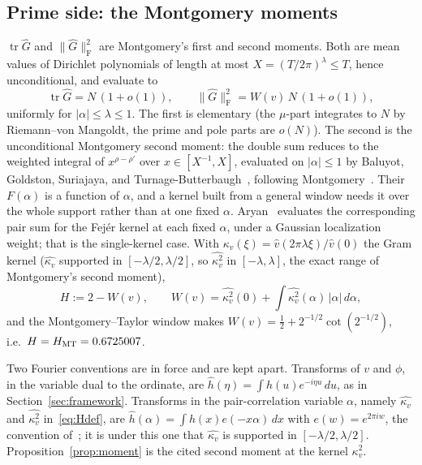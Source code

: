 \documentclass[11pt]{article}
\theoremstyle{definition}
\DeclareMathOperator{\tr}{tr}
\newcommand{\F}{\mathrm{F}}
\begin{document}
\subsection{Prime side: the Montgomery moments}
$\tr\widehat G$ and $\|\widehat G\|_{\F}^2$ are Montgomery's first and second
moments. Both are mean values of Dirichlet polynomials of length at most
$X=(T/2\pi)^\lambda\le T$, hence unconditional, and evaluate to
\begin{equation}\label{eq:moments}
  \tr\widehat G=N\,(1+o(1)),\qquad \|\widehat G\|_{\F}^2=W(v)\,N\,(1+o(1)),
\end{equation}
uniformly for $|\alpha|\le\lambda\le1$. The first is elementary (the $\mu$-part
integrates to $N$ by Riemann--von Mangoldt, the prime and pole parts are $o(N)$).
The second is the unconditional Montgomery second moment: the double sum reduces to
the weighted integral of $x^{\rho-\rho'}$ over $x\in[X^{-1},X]$, evaluated on
$|\alpha|\le1$ by Baluyot, Goldston, Suriajaya, and
Turnage-Butterbaugh~\cite{BGSTB24}, following Montgomery~\cite{Mon73,Mon75}. Their
$F(\alpha)$ is a function of $\alpha$, and a kernel built from a general window
needs it over the whole support rather than at one fixed $\alpha$. Aryan~\cite{Aryan22} evaluates the corresponding pair sum for the
Fej\'er kernel at each fixed $\alpha$, under a Gaussian localization weight; that
is the single-kernel case. With
$\kappa_v(\xi)=\widehat v(2\pi\lambda\xi)/\widehat v(0)$ the Gram kernel
($\widehat{\kappa_v}$ supported in $[-\lambda/2,\lambda/2]$, so
$\widehat{\kappa_v^2}$ in $[-\lambda,\lambda]$, the exact range of Montgomery's
second moment),
\begin{equation}\label{eq:Hdef}
  H:=2-W(v),\qquad
  W(v)=\widehat{\kappa_v^2}(0)+\int\widehat{\kappa_v^2}(\alpha)\,|\alpha|\,d\alpha,
\end{equation}
and the Montgomery--Taylor window makes $W(v)=\tfrac12+2^{-1/2}\cot(2^{-1/2})$,
i.e.\ $H=H_{\mathrm{MT}}=0.6725007$.

Two Fourier conventions are in force and are kept apart. Transforms of $v$ and
$\phi$, in the variable dual to the ordinate, are
$\widehat h(\eta)=\int h(u)e^{-i\eta u}\,du$, as in Section~\ref{sec:framework}. Transforms in the
pair-correlation variable $\alpha$, namely $\widehat{\kappa_v}$ and
$\widehat{\kappa_v^2}$ in~\eqref{eq:Hdef}, are
$\widehat h(\alpha)=\int h(x)e(-x\alpha)\,dx$ with $e(w)=e^{2\pi iw}$, the
convention of~\cite[(3.1)]{BGSTB24}; it is under this one that
$\widehat{\kappa_v}$ is supported in $[-\lambda/2,\lambda/2]$.
Proposition~\ref{prop:moment} is the cited second moment at the kernel
$\kappa_v^2$.
\end{document}
